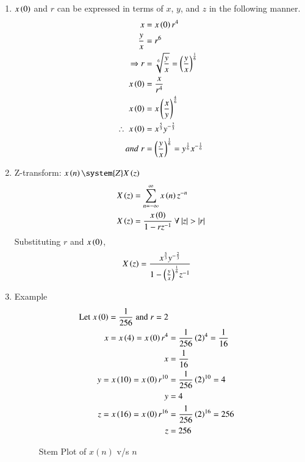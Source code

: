 \documentclass[journal,12pt,twocolumn]{IEEEtran}
\theoremstyle{remark}
\begin{document}
\begin{enumerate}
\item
$x\left(0\right)$ and $r$ can be expressed in terms of $x$, $y$, and $z$ in the following manner.
\begin{align}
       x&=x\left(0\right)r^4 \\
    \frac{y}{x}&=r^6 \\
 \Rightarrow r&=\sqrt[6]{\frac{y}{x}}=\left(\frac{y}{x}\right)^{\frac{1}{6}}\\
    x\left(0\right)&=\frac{x}{r^4}\\
    x\left(0\right)&=x\left(\frac{x}{y}\right)^{\frac{4}{6}}\\
 \therefore\; x\left(0\right)&=x^{\frac{5}{3}}y^{-\frac{2}{3}} \\
 and\; r&=\left(\frac{y}{x}\right)^{\frac{1}{6}}= y^{\frac{1}{6}}x^{-\frac{1}{6}}
\end{align}
\item 
Z-transform:    $x\brak{n} \system{Z} X\brak{z}$
\begin{align}
    X\brak{z}&= \sum_{n=-\infty}^{\infty} x\brak{n}z^{-n}\\
    X\brak{z}&=\dfrac{x\brak{0}}{1-rz^{-1}}\: \forall\: |z|>|r|
\end{align}
Substituting $r$ and $x\left(0\right)$, 
\begin{align}
     X\left(z\right)&=\dfrac{x^{\frac{5}{3}}y^{-\frac{2}{3}}}{1-{\left(\frac{y}{x}\right)^{\frac{1}{6}}}z^{-1}}
\end{align}
\item Example 
\begin{align}
    \notag\text{Let}\;x\left(0\right) =\dfrac{1}{256}\;\text{and}\;r = 2\\     \notag x=x\left(4\right)=x\left(0\right)r^4 &=\frac{1}{256}\left(2\right)^4=\frac{1}{16}\\
     x&=\frac{1}{16} \\
    y=x\left(10\right)=x\left(0\right)r^{10} &=\frac{1}{256}\left(2\right)^{10}=4\\
    \notag y&=4 \\
    z=x\left(16\right)=x\left(0\right)r^{16} &=\frac{1}{256}\left(2\right)^{16}=256\\
    \notag z&=256 
\end{align}
\newpage
\begin{figure}[h]
    \renewcommand\thefigure{1}
    \centering
    \caption{Stem Plot of $x(n)$ v/s $n$}

\end{figure}
\end{enumerate}
\end{document}
